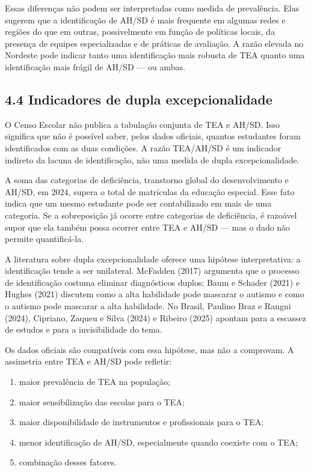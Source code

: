 Essas diferenças não podem ser interpretadas como medida de prevalência.
Elas sugerem que a identificação de AH/SD é mais frequente em algumas
redes e regiões do que em outras, possivelmente em função de políticas
locais, da presença de equipes especializadas e de práticas de
avaliação. A razão elevada no Nordeste pode indicar tanto uma
identificação mais robusta de TEA quanto uma identificação mais frágil
de AH/SD --- ou ambas.

\subsection{4.4 Indicadores de dupla
excepcionalidade}\label{indicadores-de-dupla-excepcionalidade}

O Censo Escolar não publica a tabulação conjunta de TEA e AH/SD. Isso
significa que não é possível saber, pelos dados oficiais, quantos
estudantes foram identificados com as duas condições. A razão TEA/AH/SD
é um indicador indireto da lacuna de identificação, não uma medida de
dupla excepcionalidade.

A soma das categorias de deficiência, transtorno global do
desenvolvimento e AH/SD, em 2024, supera o total de matrículas da
educação especial. Esse fato indica que um mesmo estudante pode ser
contabilizado em mais de uma categoria. Se a sobreposição já ocorre
entre categorias de deficiência, é razoável supor que ela também possa
ocorrer entre TEA e AH/SD --- mas o dado não permite quantificá-la.

A literatura sobre dupla excepcionalidade oferece uma hipótese
interpretativa: a identificação tende a ser unilateral. McFadden (2017)
argumenta que o processo de identificação costuma eliminar diagnósticos
duplos; Baum e Schader (2021) e Hughes (2021) discutem como a alta
habilidade pode mascarar o autismo e como o autismo pode mascarar a alta
habilidade. No Brasil, Paulino Braz e Rangni (2024), Cipriano, Zaqueu e
Silva (2024) e Ribeiro (2025) apontam para a escassez de estudos e para
a invisibilidade do tema.

Os dados oficiais são compatíveis com essa hipótese, mas não a
comprovam. A assimetria entre TEA e AH/SD pode refletir:

\begin{enumerate}
\def\labelenumi{\alph{enumi})}
\item
  maior prevalência de TEA na população;
\item
  maior sensibilização das escolas para o TEA;
\item
  maior disponibilidade de instrumentos e profissionais para o TEA;
\item
  menor identificação de AH/SD, especialmente quando coexiste com o TEA;
\item
  combinação desses fatores.
\end{enumerate}


